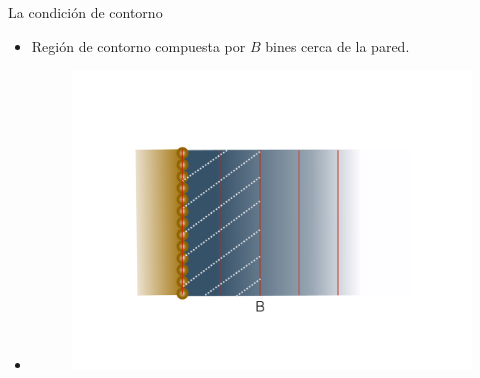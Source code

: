 \documentclass{beamer}
\begin{document}
\begin{frame}{La condición de contorno}
  \begin{itemize}
    \item[]
  \alert{Región de contorno} compuesta por $B$ bines cerca de la pared.
\item[]
  \begin{figure}
    \includegraphics[width=\linewidth]{region_contorno}
  \end{figure}
  \end{itemize}
\end{frame}
\end{document}
